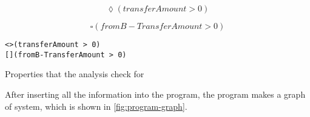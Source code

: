 \begin{equation}
    \lozenge (transferAmount > 0)
    \label{eq:ltl-eventual-property}
\end{equation}


\begin{equation}
    \square (fromB-TransferAmount > 0)
    \label{eq:ltl-always-property}
\end{equation}


\begin{listing}[htb!]
    \begin{verbatim}
<>(transferAmount > 0)
[](fromB-TransferAmount > 0)
    \end{verbatim}
    \caption{Properties that the analysis check for}
    \label{lst:properties}
\end{listing}


After inserting all the information into the program, the program makes a graph of system, which is shown in \autoref{fig:program-graph}.

